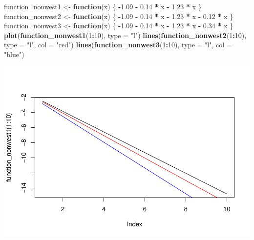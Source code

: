 \documentclass[11pt,]{article}
\newenvironment{Shaded}{\begin{snugshade}}{\end{snugshade}}
\newcommand{\KeywordTok}[1]{\textcolor[rgb]{0.13,0.29,0.53}{\textbf{#1}}}
\newcommand{\DataTypeTok}[1]{\textcolor[rgb]{0.13,0.29,0.53}{#1}}
\newcommand{\DecValTok}[1]{\textcolor[rgb]{0.00,0.00,0.81}{#1}}
\newcommand{\FloatTok}[1]{\textcolor[rgb]{0.00,0.00,0.81}{#1}}
\newcommand{\StringTok}[1]{\textcolor[rgb]{0.31,0.60,0.02}{#1}}
\newcommand{\ControlFlowTok}[1]{\textcolor[rgb]{0.13,0.29,0.53}{\textbf{#1}}}
\newcommand{\OperatorTok}[1]{\textcolor[rgb]{0.81,0.36,0.00}{\textbf{#1}}}
\newcommand{\NormalTok}[1]{#1}
\begin{document}
\begin{Shaded}
\begin{Highlighting}[]
\NormalTok{function_nonwest1 <-}\StringTok{ }\ControlFlowTok{function}\NormalTok{(x) \{}
    \OperatorTok{-}\FloatTok{1.09} \OperatorTok{-}\StringTok{ }\FloatTok{0.14} \OperatorTok{*}\StringTok{ }\NormalTok{x }\OperatorTok{-}\StringTok{ }\FloatTok{1.23} \OperatorTok{*}\StringTok{ }\NormalTok{x}
\NormalTok{\}}
\NormalTok{function_nonwest2 <-}\StringTok{ }\ControlFlowTok{function}\NormalTok{(x) \{}
    \OperatorTok{-}\FloatTok{1.09} \OperatorTok{-}\StringTok{ }\FloatTok{0.14} \OperatorTok{*}\StringTok{ }\NormalTok{x }\OperatorTok{-}\StringTok{ }\FloatTok{1.23} \OperatorTok{*}\StringTok{ }\NormalTok{x }\OperatorTok{-}\StringTok{ }\FloatTok{0.12} \OperatorTok{*}\StringTok{ }\NormalTok{x}
\NormalTok{\}}
\NormalTok{function_nonwest3 <-}\StringTok{ }\ControlFlowTok{function}\NormalTok{(x) \{}
    \OperatorTok{-}\FloatTok{1.09} \OperatorTok{-}\StringTok{ }\FloatTok{0.14} \OperatorTok{*}\StringTok{ }\NormalTok{x }\OperatorTok{-}\StringTok{ }\FloatTok{1.23} \OperatorTok{*}\StringTok{ }\NormalTok{x }\OperatorTok{-}\StringTok{ }\FloatTok{0.34} \OperatorTok{*}\StringTok{ }\NormalTok{x}
\NormalTok{\}}
\KeywordTok{plot}\NormalTok{(}\KeywordTok{function_nonwest1}\NormalTok{(}\DecValTok{1}\OperatorTok{:}\DecValTok{10}\NormalTok{), }\DataTypeTok{type =} \StringTok{"l"}\NormalTok{)}
\KeywordTok{lines}\NormalTok{(}\KeywordTok{function_nonwest2}\NormalTok{(}\DecValTok{1}\OperatorTok{:}\DecValTok{10}\NormalTok{), }\DataTypeTok{type =} \StringTok{"l"}\NormalTok{, }\DataTypeTok{col =} \StringTok{"red"}\NormalTok{)}
\KeywordTok{lines}\NormalTok{(}\KeywordTok{function_nonwest3}\NormalTok{(}\DecValTok{1}\OperatorTok{:}\DecValTok{10}\NormalTok{), }\DataTypeTok{type =} \StringTok{"l"}\NormalTok{, }\DataTypeTok{col =} \StringTok{"blue"}\NormalTok{)}
\end{Highlighting}
\end{Shaded}

\begin{center}\includegraphics{Report_files/figure-latex/unnamed-chunk-27-1} \end{center}
\end{document}
